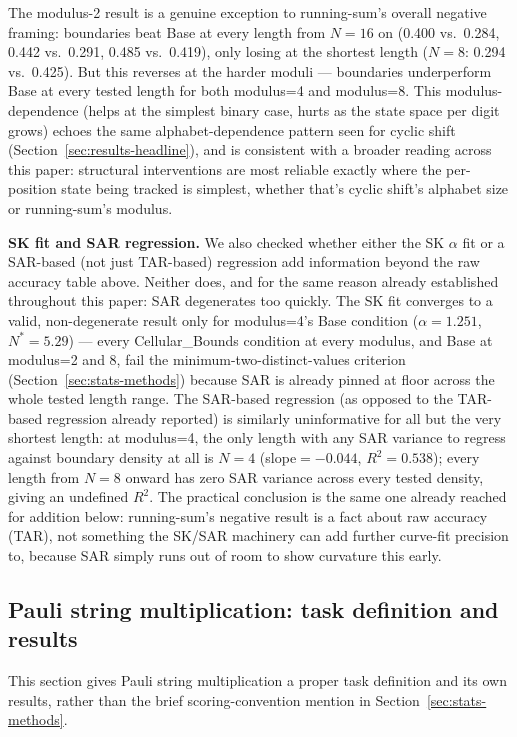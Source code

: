 \documentclass[11pt]{article}
\begin{document}
The modulus-2 result is a genuine exception to running-sum's overall negative framing: boundaries beat Base at every length from $N=16$ on (0.400 vs.\ 0.284, 0.442 vs.\ 0.291, 0.485 vs.\ 0.419), only losing at the shortest length ($N=8$: 0.294 vs.\ 0.425). But this reverses at the harder moduli --- boundaries underperform Base at every tested length for both modulus=4 and modulus=8. This modulus-dependence (helps at the simplest binary case, hurts as the state space per digit grows) echoes the same alphabet-dependence pattern seen for cyclic shift (Section~\ref{sec:results-headline}), and is consistent with a broader reading across this paper: structural interventions are most reliable exactly where the per-position state being tracked is simplest, whether that's cyclic shift's alphabet size or running-sum's modulus.

\textbf{SK fit and SAR regression.} We also checked whether either the SK $\alpha$ fit or a SAR-based (not just TAR-based) regression add information beyond the raw accuracy table above. Neither does, and for the same reason already established throughout this paper: SAR degenerates too quickly. The SK fit converges to a valid, non-degenerate result only for modulus=4's Base condition ($\alpha=1.251$, $N^*=5.29$) --- every Cellular\_Bounds condition at every modulus, and Base at modulus=2 and 8, fail the minimum-two-distinct-values criterion (Section~\ref{sec:stats-methods}) because SAR is already pinned at floor across the whole tested length range. The SAR-based regression (as opposed to the TAR-based regression already reported) is similarly uninformative for all but the very shortest length: at modulus=4, the only length with any SAR variance to regress against boundary density at all is $N=4$ (slope$=-0.044$, $R^2=0.538$); every length from $N=8$ onward has zero SAR variance across every tested density, giving an undefined $R^2$. The practical conclusion is the same one already reached for addition below: running-sum's negative result is a fact about raw accuracy (TAR), not something the SK/SAR machinery can add further curve-fit precision to, because SAR simply runs out of room to show curvature this early.

\subsection{Pauli string multiplication: task definition and results}

This section gives Pauli string multiplication a proper task definition and its own results, rather than the brief scoring-convention mention in Section~\ref{sec:stats-methods}.
\end{document}
